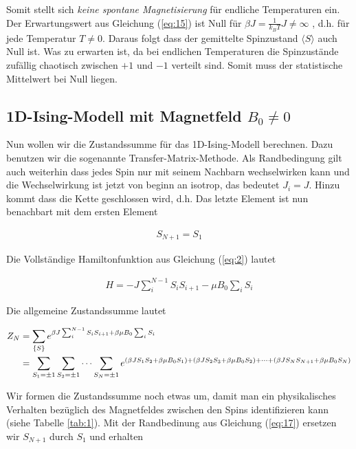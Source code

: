 Somit stellt sich \textit{keine spontane Magnetisierung} für endliche Temperaturen ein.\\

Der Erwartungswert aus Gleichung (\ref{eq:15}) ist Null für \(\beta J=\frac{1}{k_BT} J \ne \infty \) , d.h. für jede Temperatur \(T\ne 0\). Daraus folgt dass der gemittelte Spinzustand \(\langle S \rangle\)  auch Null ist. Was zu erwarten ist, da bei endlichen Temperaturen die Spinzustände zufällig chaotisch zwischen \(+ 1\) und \(-1\) verteilt sind. Somit muss der statistische Mittelwert bei Null liegen.


\subsection*{1D-Ising-Modell mit Magnetfeld $B_0\ne 0$}

Nun wollen wir die Zustandssumme für das 1D-Ising-Modell berechnen. Dazu benutzen wir die sogenannte Transfer-Matrix-Methode. Als Randbedingung gilt auch weiterhin dass jedes Spin nur mit seinem Nachbarn wechselwirken kann und die Wechselwirkung ist jetzt von beginn an isotrop, das bedeutet \(J_i = J\). Hinzu kommt dass die Kette geschlossen wird, d.h. Das letzte Element ist nun benachbart mit dem ersten Element

\begin{align}
  \label{eq:17}
  S_{N+1} = S_1
\end{align}

Die Vollständige Hamiltonfunktion aus Gleichung (\ref{eq:2}) lautet

\begin{align}
  \label{eq:18}
    H = - J \sum_{i}^{N-1} S_iS_{i+1} - \mu B_0 \sum_i S_i
\end{align}

Die allgemeine Zustandssumme lautet

\begin{align}
  \label{eq:19}
  Z_N &= \sum_{\{S\}} e^{\beta J \sum_{i}^{N-1} S_iS_{i+1} + \beta \mu B_0 \sum_i S_i }  \notag\\
&=\sum_{S_1=\pm 1}\sum_{S_2=\pm 1}\cdots \sum_{S_N=\pm 1} e^{(\beta J S_1 S_{2} + \beta \mu B_0 S_1) + (\beta J S_2 S_{3} + \beta \mu B_0 S_2) +\dots+ (\beta J S_N S_{N+1} + \beta \mu B_0 S_N) } 
\end{align}

Wir formen die Zustandssumme noch etwas um, damit man ein physikalisches Verhalten bezüglich des Magnetfeldes  zwischen den Spins identifizieren kann (siehe Tabelle \ref{tab:1}).  Mit der Randbedinung aus Gleichung (\ref{eq:17}) ersetzen wir \(S_{N+1}\) durch \(S_1\) und erhalten

